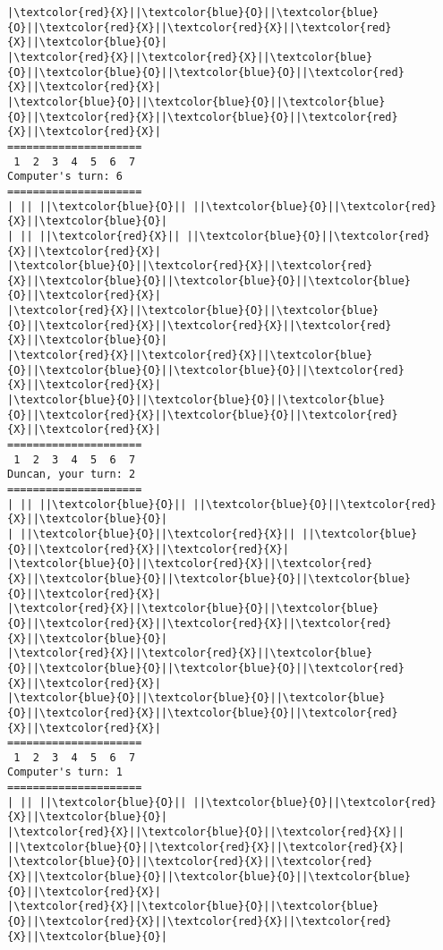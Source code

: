 \documentclass{article}
\begin{document}
\begin{Verbatim}[commandchars=\\\{\}]
|\textcolor{red}{X}||\textcolor{blue}{O}||\textcolor{blue}{O}||\textcolor{red}{X}||\textcolor{red}{X}||\textcolor{red}{X}||\textcolor{blue}{O}|
|\textcolor{red}{X}||\textcolor{red}{X}||\textcolor{blue}{O}||\textcolor{blue}{O}||\textcolor{blue}{O}||\textcolor{red}{X}||\textcolor{red}{X}|
|\textcolor{blue}{O}||\textcolor{blue}{O}||\textcolor{blue}{O}||\textcolor{red}{X}||\textcolor{blue}{O}||\textcolor{red}{X}||\textcolor{red}{X}|
=====================
 1  2  3  4  5  6  7
Computer's turn: 6
=====================
| || ||\textcolor{blue}{O}|| ||\textcolor{blue}{O}||\textcolor{red}{X}||\textcolor{blue}{O}|
| || ||\textcolor{red}{X}|| ||\textcolor{blue}{O}||\textcolor{red}{X}||\textcolor{red}{X}|
|\textcolor{blue}{O}||\textcolor{red}{X}||\textcolor{red}{X}||\textcolor{blue}{O}||\textcolor{blue}{O}||\textcolor{blue}{O}||\textcolor{red}{X}|
|\textcolor{red}{X}||\textcolor{blue}{O}||\textcolor{blue}{O}||\textcolor{red}{X}||\textcolor{red}{X}||\textcolor{red}{X}||\textcolor{blue}{O}|
|\textcolor{red}{X}||\textcolor{red}{X}||\textcolor{blue}{O}||\textcolor{blue}{O}||\textcolor{blue}{O}||\textcolor{red}{X}||\textcolor{red}{X}|
|\textcolor{blue}{O}||\textcolor{blue}{O}||\textcolor{blue}{O}||\textcolor{red}{X}||\textcolor{blue}{O}||\textcolor{red}{X}||\textcolor{red}{X}|
=====================
 1  2  3  4  5  6  7
Duncan, your turn: 2
=====================
| || ||\textcolor{blue}{O}|| ||\textcolor{blue}{O}||\textcolor{red}{X}||\textcolor{blue}{O}|
| ||\textcolor{blue}{O}||\textcolor{red}{X}|| ||\textcolor{blue}{O}||\textcolor{red}{X}||\textcolor{red}{X}|
|\textcolor{blue}{O}||\textcolor{red}{X}||\textcolor{red}{X}||\textcolor{blue}{O}||\textcolor{blue}{O}||\textcolor{blue}{O}||\textcolor{red}{X}|
|\textcolor{red}{X}||\textcolor{blue}{O}||\textcolor{blue}{O}||\textcolor{red}{X}||\textcolor{red}{X}||\textcolor{red}{X}||\textcolor{blue}{O}|
|\textcolor{red}{X}||\textcolor{red}{X}||\textcolor{blue}{O}||\textcolor{blue}{O}||\textcolor{blue}{O}||\textcolor{red}{X}||\textcolor{red}{X}|
|\textcolor{blue}{O}||\textcolor{blue}{O}||\textcolor{blue}{O}||\textcolor{red}{X}||\textcolor{blue}{O}||\textcolor{red}{X}||\textcolor{red}{X}|
=====================
 1  2  3  4  5  6  7
Computer's turn: 1
=====================
| || ||\textcolor{blue}{O}|| ||\textcolor{blue}{O}||\textcolor{red}{X}||\textcolor{blue}{O}|
|\textcolor{red}{X}||\textcolor{blue}{O}||\textcolor{red}{X}|| ||\textcolor{blue}{O}||\textcolor{red}{X}||\textcolor{red}{X}|
|\textcolor{blue}{O}||\textcolor{red}{X}||\textcolor{red}{X}||\textcolor{blue}{O}||\textcolor{blue}{O}||\textcolor{blue}{O}||\textcolor{red}{X}|
|\textcolor{red}{X}||\textcolor{blue}{O}||\textcolor{blue}{O}||\textcolor{red}{X}||\textcolor{red}{X}||\textcolor{red}{X}||\textcolor{blue}{O}|

\end{Verbatim}
\end{document}

